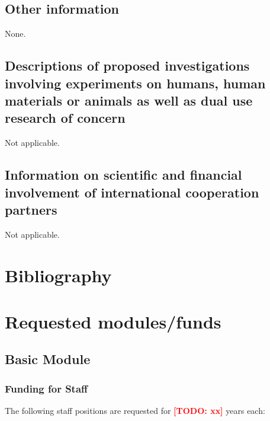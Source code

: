 \documentclass{scrartcl}
\newcommand{\todo}[1]{\xspace{\textcolor{red}{\bfseries[TODO: #1]}}\xspace}
\begin{document}
\subsection{Other information}
None.

\subsection{Descriptions of proposed investigations involving experiments on humans, human materials or animals as well as dual use research of concern}
Not applicable.

\subsection{Information on scientific and financial involvement of international cooperation partners}
Not applicable.


\section{Bibliography}
\label{sec:bib}
\printbibliography[notcategory=reviewed, notcategory=nonreviewed, notcategory=patents_pending, notcategory=patents, heading=none]

\section{Requested modules/funds}

\subsection{Basic Module}

\subsubsection{Funding for Staff}
\begin{funds}
The following staff positions are requested for \todo{xx} years each:


\end{funds}
\end{document}
